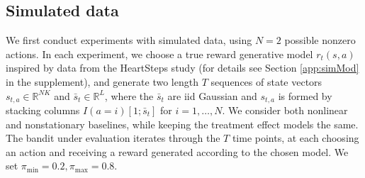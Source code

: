 \documentclass{article}
\begin{document}
\subsection{Simulated data}


We first conduct experiments with simulated data, using $N=2$ possible nonzero actions. In each experiment, we choose a true reward generative model $r_t(s,a)$ inspired by data from the HeartSteps study (for details see Section \ref{app:simMod} in the supplement), and generate two length $T$ sequences of state vectors $s_{t,a} \in \mathbb{R}^{NK}$ and $\bar{s}_t \in \mathbb{R}^L$, where the $\bar{s}_t$ are iid Gaussian and $s_{t,a}$ is formed by stacking columns $I(a = i) [1; \bar{s}_t ]$ for $i = 1,\dots, N$. We consider both nonlinear and nonstationary baselines, while keeping the treatment effect models the same. 
The bandit under evaluation iterates through the $T$ time points, at each choosing an action and receiving a reward generated according to the chosen model. We set $\pi_{\min} = 0.2, \pi_{\max} = 0.8$.
\end{document}
